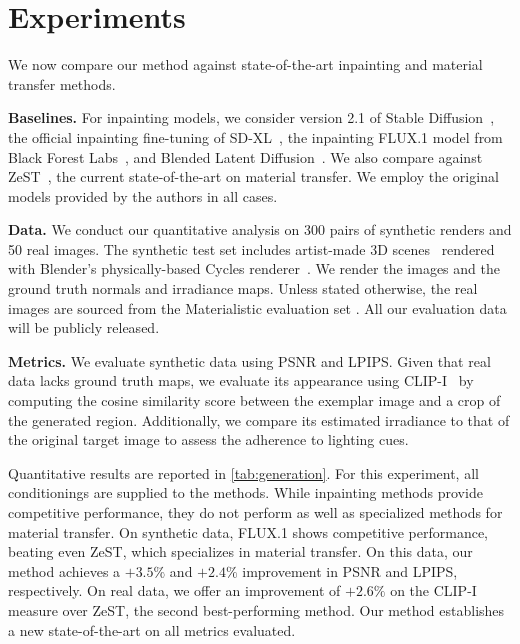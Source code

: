 





\section{Experiments}

We now compare our method against state-of-the-art inpainting and material transfer methods.

\textbf{Baselines.} For inpainting models, we consider version 2.1 of Stable Diffusion~\cite{rombach2021highresolution}, the official inpainting fine-tuning of SD-XL~\cite{podell2023sdxl}, the inpainting FLUX.1 model from Black Forest Labs~\cite{flux.1}, and Blended Latent Diffusion~\cite{avrahami2023blended}. We also compare against ZeST~\cite{cheng2024zest}, the current state-of-the-art on material transfer. We employ the original models provided by the authors in all cases. 

\textbf{Data.} We conduct our quantitative analysis on 300 pairs of synthetic renders and 50 real images. The synthetic test set includes artist-made 3D scenes~\cite{evermotion} rendered with Blender's physically-based Cycles renderer~. We render the images and the ground truth normals and irradiance maps. Unless stated otherwise, the real images are sourced from the Materialistic evaluation set \cite{sharma2023materialistic}. All our evaluation data will be publicly released. 

\textbf{Metrics.} We evaluate synthetic data using PSNR and LPIPS. Given that real data lacks ground truth maps, we evaluate its appearance using CLIP-I~\cite{radford2021learning} by computing the cosine similarity score between the exemplar image and a crop of the generated region. Additionally, we compare its estimated irradiance to that of the original target image to assess the adherence to lighting cues.



Quantitative results are reported in \cref{tab:generation}. For this experiment, all conditionings are supplied to the methods. While inpainting methods provide competitive performance, they do not perform as well as specialized methods for material transfer. On synthetic data, FLUX.1 shows competitive performance, beating even ZeST, which specializes in material transfer. On this data, our method achieves a $+3.5\%$ and $+2.4\%$ improvement in PSNR and LPIPS, respectively. On real data, we offer an improvement of $+2.6\%$ on the CLIP-I measure over ZeST, the second best-performing method. Our method establishes a new state-of-the-art on all metrics evaluated.

